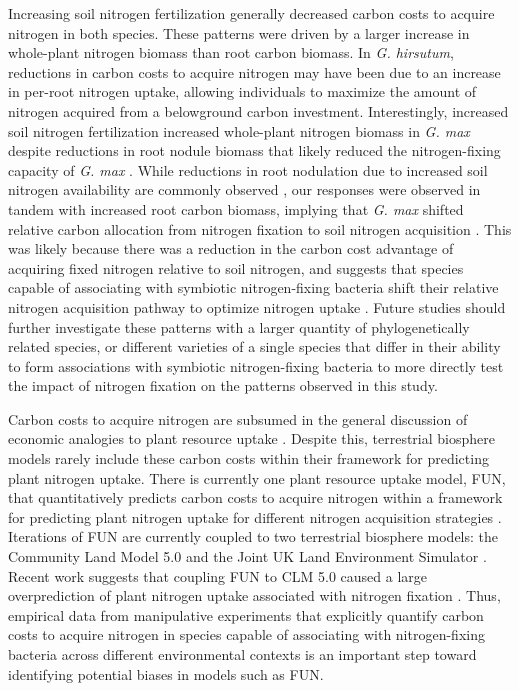 Increasing soil nitrogen fertilization generally decreased carbon costs to acquire nitrogen in both species. These patterns were driven by a larger increase in whole-plant nitrogen biomass than root carbon biomass. In \textit{G. hirsutum}, reductions in carbon costs to acquire nitrogen may have been due to an increase in per-root nitrogen uptake, allowing individuals to maximize the amount of nitrogen acquired from a belowground carbon investment. Interestingly, increased soil nitrogen fertilization increased whole-plant nitrogen biomass in \textit{G. max} despite reductions in root nodule biomass that likely reduced the nitrogen-fixing capacity of \textit{G. max} . While reductions in root nodulation due to increased soil nitrogen availability are commonly observed , our responses were observed in tandem with increased root carbon biomass, implying that \textit{G. max} shifted relative carbon allocation from nitrogen fixation to soil nitrogen acquisition . This was likely because there was a reduction in the carbon cost advantage of acquiring fixed nitrogen relative to soil nitrogen, and suggests that species capable of associating with symbiotic nitrogen-fixing bacteria shift their relative nitrogen acquisition pathway to optimize nitrogen uptake . Future studies should further investigate these patterns with a larger quantity of phylogenetically related species, or different varieties of a single species that differ in their ability to form associations with symbiotic nitrogen-fixing bacteria to more directly test the impact of nitrogen fixation on the patterns observed in this study.

Carbon costs to acquire nitrogen are subsumed in the general discussion of economic analogies to plant resource uptake . Despite this, terrestrial biosphere models rarely include these carbon costs within their framework for predicting plant nitrogen uptake. There is currently one plant resource uptake model, FUN, that quantitatively predicts carbon costs to acquire nitrogen within a framework for predicting plant nitrogen uptake for different nitrogen acquisition strategies . Iterations of FUN are currently coupled to two terrestrial biosphere models: the Community Land Model 5.0 and the Joint UK Land Environment Simulator . Recent work suggests that coupling FUN to CLM 5.0 caused a large overprediction of plant nitrogen uptake associated with nitrogen fixation . Thus, empirical data from manipulative experiments that explicitly quantify carbon costs to acquire nitrogen in species capable of associating with nitrogen-fixing bacteria across different environmental contexts is an important step toward identifying potential biases in models such as FUN.

